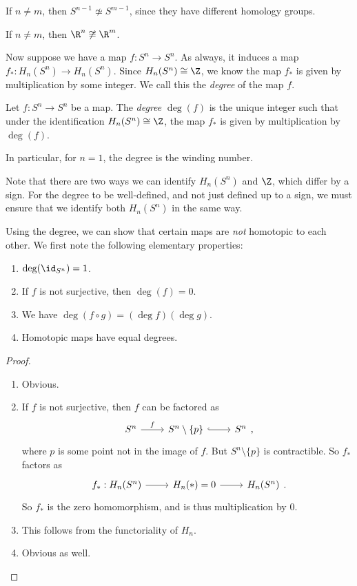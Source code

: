 \documentclass[a4paper]{article}
\theoremstyle{definition}
\begin{document}
\begin{cor}
  If $n \not= m$, then $S^{n - 1} \not\simeq S^{m - 1}$, since they have different homology groups.
\end{cor}

\begin{cor}
  If $n \not= m$, then $\R^n \not \cong \R^m$.
\end{cor}

Now suppose we have a map $f: S^n \to S^n$. As always, it induces a map $f_*: H_n(S^n) \to H_n(S^n)$. Since $H_n (S^n) \cong \Z$, we know the map $f_*$ is given by multiplication by some integer. We call this the \emph{degree} of the map $f$.
\begin{defi}
  Let $f: S^n \to S^n$ be a map. The \emph{degree} $\deg(f)$ is the unique integer such that under the identification $H_n(S^n) \cong \Z$, the map $f_*$ is given by multiplication by $\deg(f)$.
\end{defi}
In particular, for $n = 1$, the degree is the winding number.

Note that there are two ways we can identify $H_n(S^n)$ and $\Z$, which differ by a sign. For the degree to be well-defined, and not just defined up to a sign, we must ensure that we identify both $H_n(S^n)$ in the same way.

Using the degree, we can show that certain maps are \emph{not} homotopic to each other. We first note the following elementary properties:
\begin{prop}\leavevmode
  \begin{enumerate}
    \item $\deg(\id_{S^n}) = 1$.
    \item If $f$ is not surjective, then $\deg(f) = 0$.
    \item We have $\deg(f\circ g) = (\deg f)(\deg g)$.
    \item Homotopic maps have equal degrees.
  \end{enumerate}
\end{prop}

\begin{proof}\leavevmode
  \begin{enumerate}
    \item Obvious.
    \item If $f$ is not surjective, then $f$ can be factored as
      \[
        \begin{tikzcd}
          S^n \ar[r, "f"] & S^n \setminus \{p\} \ar[r, hook] & S^n
        \end{tikzcd},
      \]
      where $p$ is some point not in the image of $f$. But $S^n \setminus \{p\}$ is contractible. So $f_*$ factors as
      \[
        \begin{tikzcd}
          f_*: H_n(S^n) \ar[r] & H_n(*) = 0 \ar[r] & H_n(S^n)
        \end{tikzcd}.
      \]
      So $f_*$ is the zero homomorphism, and is thus multiplication by $0$.
    \item This follows from the functoriality of $H_n$.
    \item Obvious as well.\qedhere
  \end{enumerate}
\end{proof}
\end{document}
